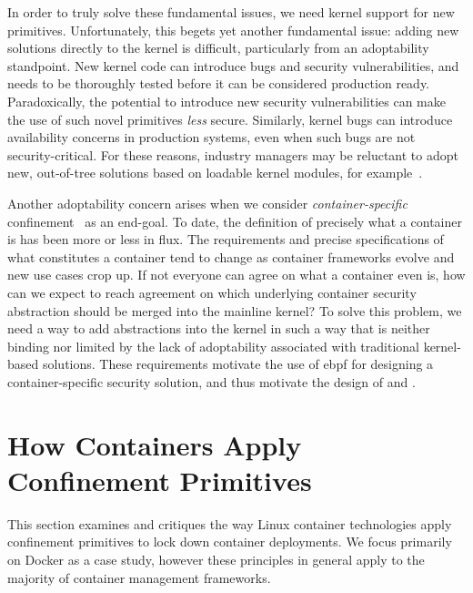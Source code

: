 \begin{enumerate}[font=\bfseries]
    In order to truly solve these fundamental issues, we need kernel support for new
    primitives. Unfortunately, this begets yet another fundamental issue: adding new
    solutions directly to the kernel is difficult, particularly from an adoptability
    standpoint. New kernel code can introduce bugs and security vulnerabilities, and needs
    to be thoroughly tested before it can be considered production ready. Paradoxically,
    the potential to introduce new security vulnerabilities can make the use of such novel
    primitives \textit{less} secure. Similarly, kernel bugs can introduce availability
    concerns in production systems, even when such bugs are not security-critical. For
    these reasons, industry managers may be reluctant to adopt new, out-of-tree solutions
    based on loadable kernel modules, for example~\cite{gregg2019_bpf}.

    Another adoptability concern arises when we consider \textit{container-specific}
    confinement~\cite{sultan2019_container_security, sun2018_security_namespace} as an
    end-goal.  To date, the definition of precisely what a container is has been more or
    less in flux. The requirements and precise specifications of what constitutes
    a container tend to change as container frameworks evolve and new use cases crop up.
    If not everyone can agree on what a container even is, how can we expect to reach
    agreement on which underlying container security abstraction should be merged into the
    mainline kernel? To solve this problem, we need a way to add abstractions into the
    kernel in such a way that is neither binding nor limited by the lack of adoptability
    associated with traditional kernel-based solutions. These requirements motivate the
    use of \gls{ebpf} for designing a container-specific security solution, and thus
    motivate the design of \bpfbox{} and \bpfcontain{}.
\end{enumerate}



\section{How Containers Apply Confinement Primitives}%
\label{s:cp-containers}

This section examines and critiques the way Linux container technologies apply confinement
primitives to lock down container deployments. We focus primarily on Docker as a case
study, however these principles in general apply to the majority of container management
frameworks.

